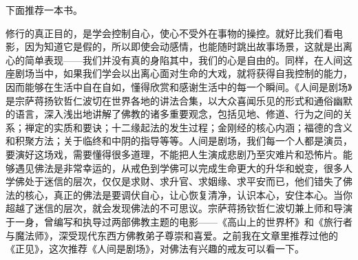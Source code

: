 下面推荐一本书。

\begin{book}
    修行的真正目的，是学会控制自心，使心不受外在事物的操控。就好比我们看电影，因为知道它是假的，所以即使会动感情，也能随时跳出故事场景，这就是出离心的简单表现——我们并没有真的身陷其中，我们的心是自由的。同样，在人间这座剧场当中，如果我们学会以出离心面对生命的大戏，就将获得自我控制的能力，因而能够在生活中自在自如，懂得欣赏和感谢生活中的每一个瞬间。《人间是剧场》是宗萨蒋扬钦哲仁波切在世界各地的讲法合集，以大众喜闻乐见的形式和通俗幽默的语言，深入浅出地讲解了佛教的诸多重要观念，包括见地、修道、行为之间的关系；禅定的实质和要诀；十二缘起法的发生过程；金刚经的核心内涵；福德的含义和积聚方法；关于临终和中阴的指导等等。人间是剧场，我们每一个人都是演员，要演好这场戏，需要懂得很多道理，不能把人生演成悲剧乃至灾难片和恐怖片。能够遇见佛法是非常幸运的，从戒色到学佛可以完成生命更大的升华和蜕变，很多人学佛处于迷信的层次，仅仅是求财、求升官、求姻缘、求平安而已，他们错失了佛法的核心，真正的佛法是要调伏自心，让心恢复清净，认识本心，安住本心。当你超越了迷信的层次，就会发现佛法的不可思议。宗萨蒋扬钦哲仁波切兼上师和导演于一身，曾编写和执导过两部佛教主题的电影——《高山上的世界杯》和《旅行者与魔法师》，深受现代东西方佛教弟子尊崇和喜爱。之前我在文章里推荐过他的《正见》，这次推荐《人间是剧场》，对佛法有兴趣的戒友可以看一下。
\end{book}
